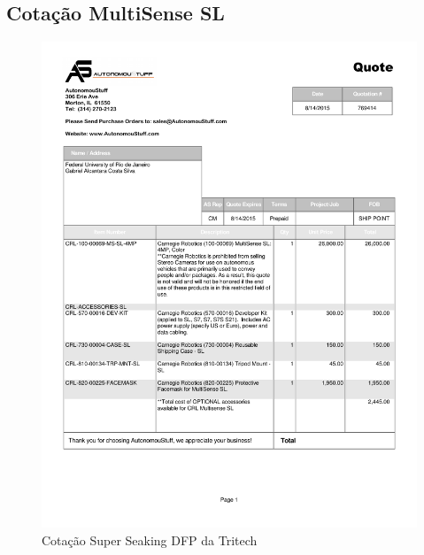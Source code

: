 \documentclass{article}
\begin{document}
\subsection{Cotação MultiSense SL}
\begin{figure}[H]
 \centering
 \includegraphics[page=1,width=1\columnwidth]{figs/forecast/quote2.pdf}
 \caption{Cotação Super Seaking DFP da Tritech}
\end{figure}
\end{document}
